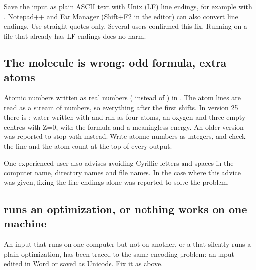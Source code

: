 \documentclass[letterpaper,10pt,english,openany,oneside]{sphinxmanual}
\begin{document}
\sphinxAtStartPar
{} Save the input as plain ASCII text with Unix (LF) line endings, for example with .
Notepad++ and Far Manager (Shift+F2 in the editor) can also convert line endings. Use straight quotes only. Several
users confirmed this fix. Running  on a file that already has LF endings does no harm.




\subsection{The molecule is wrong: odd formula, extra atoms}
\label{\detokenize{troubleshooting/common-problems:the-molecule-is-wrong-odd-formula-extra-atoms}}
\sphinxAtStartPar
Atomic numbers written as real numbers ( instead of ) in . The atom lines are read as a stream of
numbers, so everything after the first  shifts. In version 25 there is : water written with  and
 ran as four atoms, an oxygen and three empty centres with Z=0, with the formula  and a meaningless
energy. An older version was reported to stop with  instead. Write atomic numbers as
integers, and check the  line and the atom count at the top of every output.



\sphinxAtStartPar
One experienced user also advises avoiding Cyrillic letters and spaces in the computer name, directory names and file
names. In the case where this advice was given, fixing the line endings alone was reported to solve the problem.




\subsection{ runs an optimization, or nothing works on one machine}
\label{\detokenize{troubleshooting/common-problems:task-scan-runs-an-optimization-or-nothing-works-on-one-machine}}
\sphinxAtStartPar
An input that runs on one computer but not on another, or a  that silently runs a plain optimization, has
been traced to the same encoding problem: an input edited in Word or saved as Unicode. Fix it as above.
\end{document}
